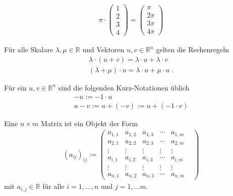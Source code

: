 \begin{Beispiel}
 
\begin{align*}
\pi \cdot
\begin{pmatrix}
1 \\ 2  \\  3 \\ 4
\end{pmatrix}  
=  \begin{pmatrix}
\pi   \\ 2  \pi  \\  3 \pi \\  4  \pi
\end{pmatrix} 
\end{align*}

\begin{Bemerkung}
Für alle Skalare $\lambda, \mu \in \mathbb{R}$ und Vektoren $u,v \in  \mathbb{R}^n$ gelten die  Rechenregeln
\begin{align*}
\lambda \cdot (u +v) = \lambda \cdot u + \lambda \cdot v \\
(\lambda + \mu)  \cdot u  = \lambda  \cdot u + \mu  \cdot u \; .
\end{align*}
\end{Bemerkung}

\begin{Definition}
Für ein $u,v \in  \mathbb{R}^n$ sind die folgenden Kurz-Notationen üblich
\begin{align*}
-u :=  -1 \cdot u \\
u -v := u + (-v) := u + (-1 \cdot v) 
\end{align*}  
\end{Definition}
\end{Beispiel}

\begin{Definition}
Eine $n \times m$ Matrix ist ein Objekt der Form
\begin{align*}
(a_{ij})_{ij} := \begin{pmatrix}
a_{1,1} &  a_{1,2} & a_{1,3} & \cdots & a_{1,m}   \\  
a_{2,1} &  a_{2,2} & a_{2,3} & \cdots & a_{2,m} \\  
 \vdots &  \vdots &\vdots & \vdots & \vdots & \\ 
a_{i,1} &  a_{i,2} & a_{i,3} & \cdots & a_{i,m} \\
 \vdots &  \vdots &\vdots & \vdots & \vdots & \\ 
a_{n,1} &  a_{n,2} & a_{n,3} & \cdots & a_{n,m}  
\end{pmatrix}  
\end{align*} 
mit $a_{i,j} \in \mathbb{R}$ für alle $i = 1, \hdots, n$ und $j = 1, \hdots m$.
\end{Definition}


